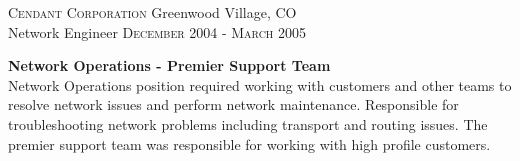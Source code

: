 
\textsc{Cendant Corporation} \hfill Greenwood Village, CO\\
Network Engineer \hfill \textsc{December 2004} - \textsc{March 2005}

\textbf{Network Operations - Premier Support Team}\\
Network Operations position required working with customers and other teams to
resolve network issues and perform network maintenance. Responsible for
troubleshooting network problems including transport and routing issues.  The
premier support team was responsible for working with high profile customers.

